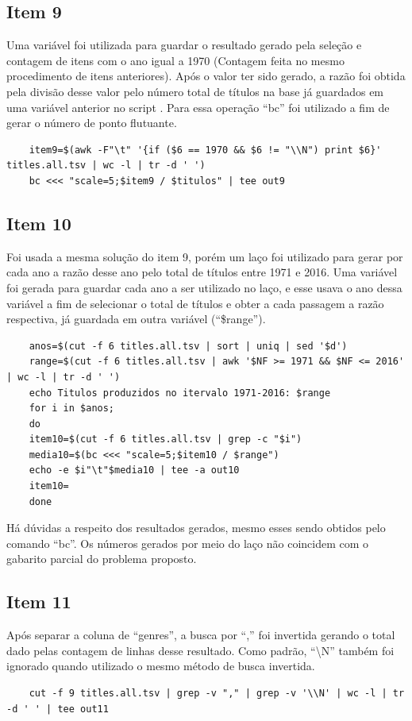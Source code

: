 \documentclass[12pt]{article}
\begin{document}
	\subsection*{Item 9}
	Uma variável foi utilizada para guardar o resultado gerado pela seleção e contagem de itens com o ano igual a 1970 (Contagem feita no mesmo procedimento de itens anteriores). Após o valor ter sido gerado, a razão foi obtida pela divisão desse valor pelo número total de títulos na base já guardados em uma variável anterior no script . Para essa operação ``bc''  foi utilizado a fim de gerar o número de ponto flutuante.
	\begin{verbatim}
	item9=$(awk -F"\t" '{if ($6 == 1970 && $6 != "\\N") print $6}' titles.all.tsv | wc -l | tr -d ' ')
	bc <<< "scale=5;$item9 / $titulos" | tee out9
	\end{verbatim}
	\subsection*{Item 10}
	Foi usada a mesma solução do item 9, porém um laço foi utilizado para gerar por cada ano a razão desse ano pelo total de títulos entre 1971 e 2016.
	Uma variável foi gerada para guardar cada ano a ser utilizado no laço, e esse usava o ano dessa variável a fim de selecionar o total de títulos e obter a cada passagem a razão respectiva, já guardada em outra variável (``\$range'').
	\begin{verbatim}
	anos=$(cut -f 6 titles.all.tsv | sort | uniq | sed '$d')
	range=$(cut -f 6 titles.all.tsv | awk '$NF >= 1971 && $NF <= 2016' | wc -l | tr -d ' ')
	echo Titulos produzidos no itervalo 1971-2016: $range
	for i in $anos;
	do
	item10=$(cut -f 6 titles.all.tsv | grep -c "$i")
	media10=$(bc <<< "scale=5;$item10 / $range")
	echo -e $i"\t"$media10 | tee -a out10
	item10=
	done
	\end{verbatim}
	Há dúvidas a respeito dos resultados gerados, mesmo esses sendo obtidos pelo comando ``bc''. Os números gerados por meio do laço não coincidem com o gabarito parcial do problema proposto.
	\subsection*{Item 11}
	Após separar a coluna de ``genres'', a busca por  ``,''  foi invertida gerando o total dado pelas contagem de linhas desse resultado. Como padrão, ``\textbackslash N'' também foi ignorado quando utilizado o mesmo método de busca invertida.
	\begin{verbatim}
	cut -f 9 titles.all.tsv | grep -v "," | grep -v '\\N' | wc -l | tr -d ' ' | tee out11
	\end{verbatim}
\end{document}
